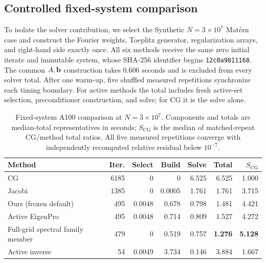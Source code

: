 \subsection{Controlled fixed-system comparison}
\label{subsec:matched-confirmation}

To isolate the solver contribution, we select the Synthetic
\(N=3\times10^7\) Mat\'ern case and construct the Fourier weights, Toeplitz
generator, regularization arrays, and right-hand side exactly once.  All six
methods receive the same zero initial iterate and immutable system, whose
SHA-256 identifier begins \texttt{12c0a9811168}.  The common \(A,\mathbf b\)
construction takes \(0.606\) seconds and is excluded from every solver total.
After one warm-up, five shuffled measured repetitions synchronize each timing
boundary.  For active methods the total includes fresh active-set selection,
preconditioner construction, and solve; for CG it is the solve alone.

\begin{table}[H]
\centering
\footnotesize
\setlength{\tabcolsep}{3.4pt}
\caption{Fixed-system A100 comparison at \(N=3\times10^7\).  Components and
totals are median-total representatives in seconds; \(S_{\mathrm{CG}}\) is
the median of matched-repeat CG/method total ratios.  All five measured
repetitions converge with independently recomputed relative residual below
\(10^{-7}\).}
\label{tab:fixed-system-formal}
\begin{tabular}{lrrrrrr}
\toprule
Method & Iter. & Select & Build & Solve & Total & \(S_{\mathrm{CG}}\) \\
\midrule
CG & 6185 & 0 & 0 & 6.525 & 6.525 & 1.000 \\
Jacobi & 1385 & 0 & 0.0005 & 1.761 & 1.761 & 3.715 \\
Ours (frozen default) & 495 & 0.0048 & 0.678 & 0.798 & 1.481 & 4.421 \\
Active EigenPro & 495 & 0.0048 & 0.714 & 0.809 & 1.527 & 4.272 \\
Full-grid spectral family member & 479 & 0 & 0.519 & 0.757 & \textbf{1.276} & \textbf{5.128} \\
Active inverse & 54 & 0.0049 & 3.734 & 0.146 & 3.884 & 1.667 \\
\bottomrule
\end{tabular}%
\end{table}


